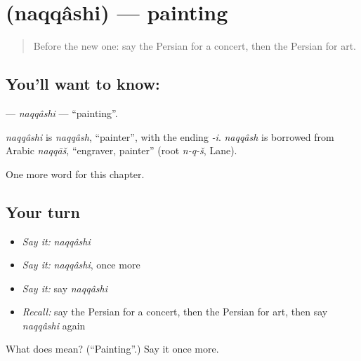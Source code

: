 \section[\texorpdfstring{\fa{نقاشی} (naqqâshi)}{نقاشی (naqqâshi)}]{ (naqqâshi) — painting}

\label{lesson:FA-C280-naqqashi}



\begin{quote}
Before the new one: say the Persian for a concert, then the Persian for art.
\end{quote}

\subsection*{You'll want to know: }
\textbf{} — \emph{naqqâshi} — \textquotedblleft{}painting\textquotedblright{}.

\begin{cousinweb}
\emph{naqqâshi} is \emph{naqqâsh}, \textquotedblleft{}painter\textquotedblright{}, with the ending \emph{-i}. \emph{naqqâsh} is borrowed from Arabic \emph{naqqāš}, \textquotedblleft{}engraver, painter\textquotedblright{} (root \emph{n-q-š}, Lane).
\end{cousinweb}

\begin{grammarlens}[title={What you've built}]
One more word for this chapter.
\end{grammarlens}

\subsection*{Your turn}
\begin{itemize}
\raggedright
  \item \emph{Say it:} \emph{naqqâshi}
  \item \emph{Say it:} \emph{naqqâshi}, once more
  \item \emph{Say it:} say \emph{naqqâshi}
  \item \emph{Recall:} say the Persian for a concert, then the Persian for art, then say \emph{naqqâshi} again
\end{itemize}

\begin{tcolorbox}[breakable,colback=teal!4,colframe=teal!35!black,title={Before you move on}]
What does  mean? (\textquotedblleft{}Painting\textquotedblright{}.) Say it once more.
\end{tcolorbox}
